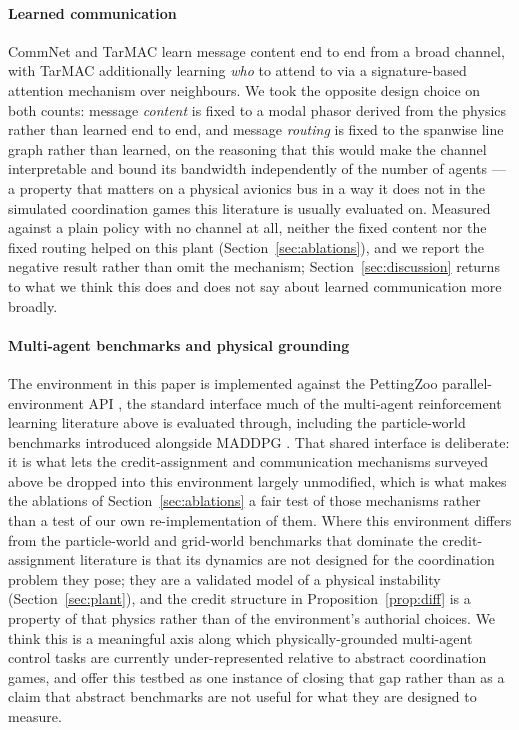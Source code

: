 \documentclass[preprint,11pt,authoryear]{elsarticle}
\begin{document}
\paragraph{Learned communication}
CommNet \citep{sukhbaatar2016commnet} and TarMAC \citep{das2019tarmac} learn
message content end to end from a broad channel, with TarMAC additionally
learning \emph{who} to attend to via a signature-based attention mechanism over
neighbours. We took the opposite design choice on both counts: message
\emph{content} is fixed to a modal phasor derived from the physics rather than
learned end to end, and message \emph{routing} is fixed to the spanwise line
graph rather than learned, on the reasoning that this would make the channel
interpretable and bound its bandwidth independently of the number of agents ---
a property that matters on a physical avionics bus in a way it does not in the
simulated coordination games this literature is usually evaluated on. Measured
against a plain policy with no channel at all, neither the fixed content nor
the fixed routing helped on this plant (Section~\ref{sec:ablations}), and we
report the negative result rather than omit the mechanism; Section~\ref{sec:discussion}
returns to what we think this does and does not say about learned communication
more broadly.

\paragraph{Multi-agent benchmarks and physical grounding}
The environment in this paper is implemented against the PettingZoo
parallel-environment API \citep{terry2021pettingzoo}, the standard interface
much of the multi-agent reinforcement learning literature above is evaluated
through, including the particle-world benchmarks introduced alongside MADDPG
\citep{lowe2017maddpg}. That shared interface is deliberate: it is what lets
the credit-assignment and communication mechanisms surveyed above be dropped
into this environment largely unmodified, which is what makes the ablations of
Section~\ref{sec:ablations} a fair test of those mechanisms rather than a test
of our own re-implementation of them. Where this environment differs from the
particle-world and grid-world benchmarks that dominate the credit-assignment
literature is that its dynamics are not designed for the coordination problem
they pose; they are a validated model of a physical instability
(Section~\ref{sec:plant}), and the credit structure in
Proposition~\ref{prop:diff} is a property of that physics rather than of the
environment's authorial choices. We think this is a meaningful axis along
which physically-grounded multi-agent control tasks are currently
under-represented relative to abstract coordination games, and offer this
testbed as one instance of closing that gap rather than as a claim that
abstract benchmarks are not useful for what they are designed to measure.
\end{document}
